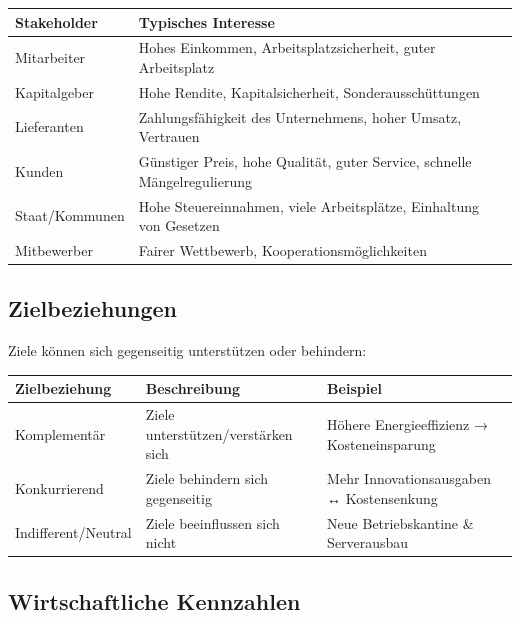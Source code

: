 \documentclass[11pt, a4paper]{article}
\begin{document}
\begin{center}
\begin{tabular}{p{3.5cm} p{9.5cm}}
\toprule
\textbf{Stakeholder} & \textbf{Typisches Interesse}\\
\midrule
Mitarbeiter & Hohes Einkommen, Arbeitsplatzsicherheit, guter Arbeitsplatz\\
Kapitalgeber & Hohe Rendite, Kapitalsicherheit, Sonderausschüttungen\\
Lieferanten & Zahlungsfähigkeit des Unternehmens, hoher Umsatz, Vertrauen\\
Kunden & Günstiger Preis, hohe Qualität, guter Service, schnelle Mängelregulierung\\
Staat/Kommunen & Hohe Steuereinnahmen, viele Arbeitsplätze, Einhaltung von Gesetzen\\
Mitbewerber & Fairer Wettbewerb, Kooperationsmöglichkeiten\\
\bottomrule
\end{tabular}
\end{center}

\subsection{Zielbeziehungen}

Ziele können sich gegenseitig unterstützen oder behindern:

\begin{center}
\begin{tabular}{p{4cm} p{4.5cm} p{4.5cm}}
\toprule
\textbf{Zielbeziehung} & \textbf{Beschreibung} & \textbf{Beispiel}\\
\midrule
Komplementär & Ziele unterstützen/verstärken sich & Höhere Energieeffizienz → Kosteneinsparung\\
Konkurrierend & Ziele behindern sich gegenseitig & Mehr Innovationsausgaben ↔ Kostensenkung\\
Indifferent/Neutral & Ziele beeinflussen sich nicht & Neue Betriebskantine \& Serverausbau\\
\bottomrule
\end{tabular}
\end{center}

\subsection{Wirtschaftliche Kennzahlen}
\end{document}
